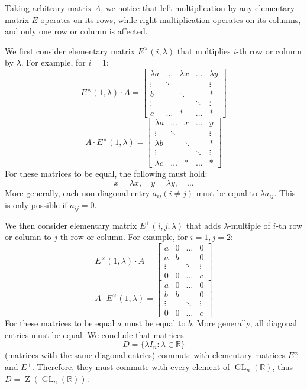 \documentclass{article}
\theoremstyle{definition}
\newcommand{\R}{\mathbb{R}}
\newcommand{\GL}[2]{\operatorname{GL}_{#1}(#2)}
\newcommand{\GLnR}{\GL{n}{\R}}
\begin{document}
Taking arbitrary matrix $A$, we notice that left-multiplication by any elementary matrix $E$ operates on its rows, while right-multiplication operates on its columns, and only one row or column is affected.

We first consider elementary matrix $E^{\times}(i, \lambda)$ that multiplies $i$-th row or column by $\lambda$. For example, for $i=1$:
\[ E^{\times}(1, \lambda) \cdot A =
    \begin{bmatrix}
        \lambda a & \dots & \lambda x & \dots & \lambda y \\
        \vdots & \ddots & & & \vdots \\
        b & & \ddots & & * \\
        \vdots & & & \ddots & \vdots \\
        c & \dots & * & \dots & * 
    \end{bmatrix}
\]
\[ A \cdot E^{\times}(1, \lambda) =
    \begin{bmatrix}
        \lambda a & \dots & x & \dots & y \\
        \vdots & \ddots & & & \vdots \\
        \lambda b & & \ddots & & * \\
        \vdots & & & \ddots & \vdots \\
        \lambda c & \dots & * & \dots & * 
    \end{bmatrix}
\]
For these matrices to be equal, the following must hold:
\[ x = \lambda x, \quad y = \lambda y, \quad \dots \]
More generally, each non-diagonal entry $a_{ij} (i \neq j)$ must be equal to $\lambda a_{ij}$. This is only possible if $a_{ij} = 0$.

We then consider elementary matrix $E^{+}(i, j, \lambda)$ that adds $\lambda$-multiple of $i$-th row or column to $j$-th row or column.
For example, for $i=1, j=2$:
\[ E^{\times}(1, \lambda) \cdot A =
    \begin{bmatrix}
        a & 0 & \dots & 0 \\
        a & b & & 0 \\
        \vdots & & \ddots & \vdots \\
        0 & 0 & \dots & c
    \end{bmatrix}
\]
\[  A \cdot E^{\times}(1, \lambda) =
    \begin{bmatrix}
        a & 0 & \dots & 0 \\
        b & b & & 0 \\
        \vdots & & \ddots & \vdots \\
        0 & 0 & \dots & c
    \end{bmatrix}
\]
For these matrices to be equal $a$ must be equal to $b$. More generally, all diagonal entries must be equal. We conclude that matrices
\[ D = \{ \lambda I_n : \lambda \in \R \} \]
(matrices with the same diagonal entries) commute with elementary matrices $E^{\times}$ and $E^{+}$. Therefore, they must commute with every element of $\GLnR$, thus $D = \operatorname{Z}(\GLnR)$.
\end{document}
